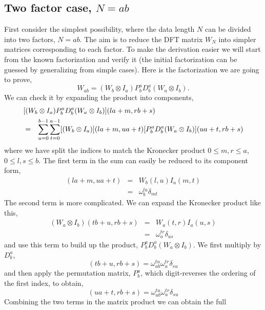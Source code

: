 \documentclass[fleqn,12pt]{article}
\begin{document}
\subsection{Two factor case, $N=ab$}
%
First consider the simplest possibility, where the data length $N$ can
be divided into two factors, $N=ab$. The aim is to reduce the DFT
matrix $W_N$ into simpler matrices corresponding to each factor. To
make the derivation easier we will start from the known factorization
and verify it (the initial factorization can be guessed by
generalizing from simple cases). Here is the factorization we are
going to prove,
%
\begin{equation}
W_{ab} = (W_b \otimes I_a) P^a_b D^a_b (W_a \otimes I_b).
\end{equation}
%
We can check it by expanding the product into components,
%
\begin{eqnarray}
\lefteqn{[(W_b \otimes I_a) P^a_b D^a_b (W_a \otimes I_b)](la+m,rb+s)}  \\
& = &
\sum_{u=0}^{b-1} \sum_{t=0}^{a-1}
[(W_b \otimes I_a)](la+m,ua+t) [P^a_b D^a_b (W_a \otimes I_b)](ua+t,rb+s)
\end{eqnarray}
%
where we have split the indices to match the Kronecker product $0 \leq
m, r \leq a$, $0 \leq l, s \leq b$.  The first term in the sum can
easily be reduced to its component form,
%
\begin{eqnarray}
[(W_b \otimes I_a)](la+m,ua+t) 
&=& W_b(l,u) I_a(m,t) \\
&=& \omega_b^{lu} \delta_{mt}
\end{eqnarray}
%
The second term is more complicated. We can expand the Kronecker
product like this,
\begin{eqnarray}
(W_a \otimes I_b)(tb+u,rb+s)
&=& W_a(t,r) I_a(u,s) \\
&=& \omega_a^{tr} \delta_{us}
\end{eqnarray}
%
and use this term to build up the product, $P^a_b D^a_b (W_a \otimes
I_b)$. We first multiply by $D^a_b$,
%
\begin{equation}
[D^a_b (W_a \otimes I_b)](tb+u,rb+s) 
= 
\omega^{tu}_{ab} \omega^{tr}_{a} \delta_{su}
\end{equation}
%
and then apply the permutation matrix, $P^a_b$, which digit-reverses
the ordering of the first index, to obtain,
%
\begin{equation}
[P^a_b D^a_b (W_a \otimes I_b)](ua+t,rb+s) 
= 
\omega^{tu}_{ab} \omega^{tr}_{a} \delta_{su}
\end{equation}
%
Combining the two terms in the matrix product we can obtain the full
\end{document}
